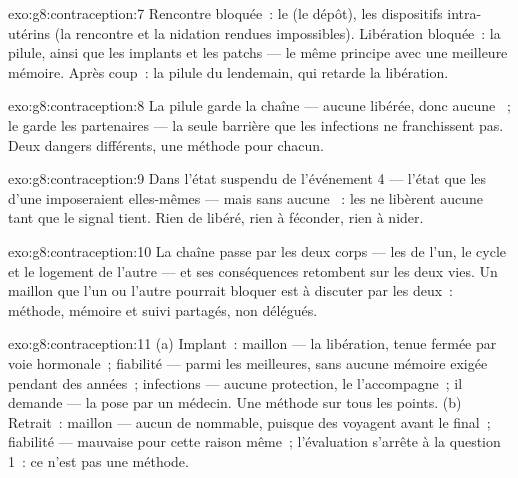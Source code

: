 \begin{solution}{exo:g8:contraception:7}
Rencontre bloquée~: le  (le dépôt), les dispositifs
intra-utérins (la rencontre et la nidation rendues impossibles).
Libération bloquée~: la pilule, ainsi que les implants et les patchs
--- le même principe avec une meilleure mémoire. Après coup~: la
pilule du lendemain, qui retarde la libération.
\end{solution}

\begin{solution}{exo:g8:contraception:8}
La pilule garde la chaîne --- aucune  libérée, donc
aucune ~; le  garde les partenaires --- la seule
barrière que les infections ne franchissent pas. Deux dangers
différents, une méthode pour chacun.
\end{solution}

\begin{solution}{exo:g8:contraception:9}
Dans l'état suspendu de l'événement 4 --- l'état que les 
d'une  imposeraient elles-mêmes --- mais sans aucune
~: les  ne libèrent aucune  tant que le
signal tient. Rien de libéré, rien à féconder, rien à nider.
\end{solution}

\begin{solution}{exo:g8:contraception:10}
La chaîne passe par les deux corps --- les  de l'un, le cycle
et le logement de l'autre --- et ses conséquences retombent sur les
deux vies. Un maillon que l'un ou l'autre pourrait bloquer est à
discuter par les deux~: méthode, mémoire et suivi partagés, non
délégués.
\end{solution}

\begin{solution}{exo:g8:contraception:11}
(a) Implant~: maillon --- la libération, tenue fermée par voie
hormonale~; fiabilité --- parmi les meilleures, sans aucune mémoire
exigée pendant des années~; infections --- aucune protection, le
 l'accompagne~; il demande --- la pose par un médecin.
Une méthode sur tous les points. (b) Retrait~: maillon --- aucun de
nommable, puisque des  voyagent avant le final~;
fiabilité --- mauvaise pour cette raison même~; l'évaluation
s'arrête à la question 1~: ce n'est pas une méthode.
\end{solution}

